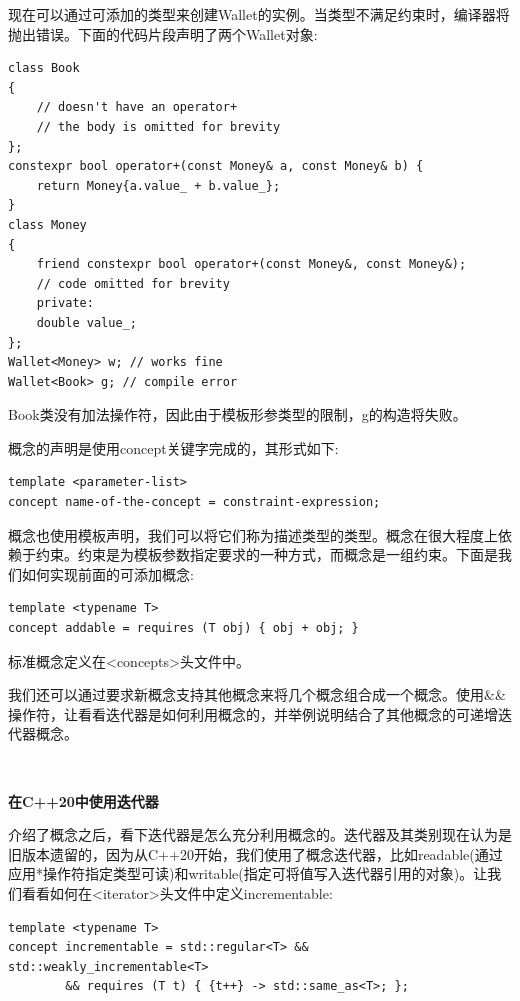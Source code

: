 现在可以通过可添加的类型来创建Wallet的实例。当类型不满足约束时，编译器将抛出错误。下面的代码片段声明了两个Wallet对象: \par

\begin{lstlisting}[caption={}]
class Book
{
	// doesn't have an operator+
	// the body is omitted for brevity
};
constexpr bool operator+(const Money& a, const Money& b) {
	return Money{a.value_ + b.value_};
}
class Money
{
	friend constexpr bool operator+(const Money&, const Money&);
	// code omitted for brevity
	private:
	double value_;
};
Wallet<Money> w; // works fine
Wallet<Book> g; // compile error
\end{lstlisting}

Book类没有加法操作符，因此由于模板形参类型的限制，g的构造将失败。 \par
概念的声明是使用concept关键字完成的，其形式如下: \par

\begin{lstlisting}[caption={}]
template <parameter-list>
concept name-of-the-concept = constraint-expression;
\end{lstlisting}

概念也使用模板声明，我们可以将它们称为描述类型的类型。概念在很大程度上依赖于约束。约束是为模板参数指定要求的一种方式，而概念是一组约束。下面是我们如何实现前面的可添加概念: \par

\begin{lstlisting}[caption={}]
template <typename T>
concept addable = requires (T obj) { obj + obj; }
\end{lstlisting}

标准概念定义在<concepts>头文件中。 \par
我们还可以通过要求新概念支持其他概念来将几个概念组合成一个概念。使用\&\&操作符，让看看迭代器是如何利用概念的，并举例说明结合了其他概念的可递增迭代器概念。 \par

\noindent\textbf{}\ \par
\textbf{在C++20中使用迭代器} \ \par
介绍了概念之后，看下迭代器是怎么充分利用概念的。迭代器及其类别现在认为是旧版本遗留的，因为从C++20开始，我们使用了概念迭代器，比如readable(通过应用*操作符指定类型可读)和writable(指定可将值写入迭代器引用的对象)。让我们看看如何在<iterator>头文件中定义incrementable: \par

\begin{lstlisting}[caption={}]
template <typename T>
concept incrementable = std::regular<T> && std::weakly_incrementable<T>
		&& requires (T t) { {t++} -> std::same_as<T>; };
\end{lstlisting}

